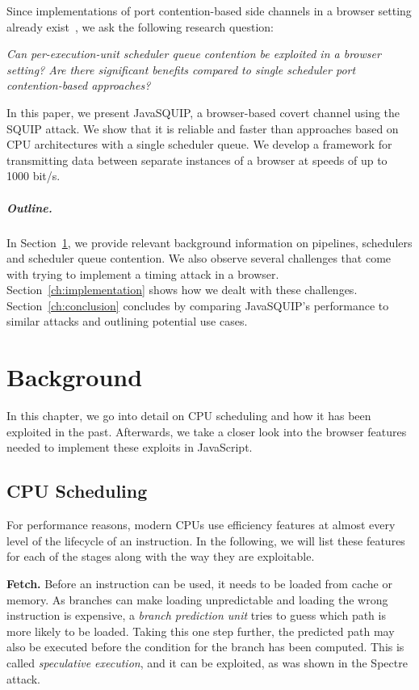 \documentclass[11pt,
  titlepage=false,
]{scrreprt}
\begin{document}
Since implementations of port contention-based side channels in a browser setting already exist~\cite{Rokicki2022webport}, we ask the following research question:

\textit{Can per-execution-unit scheduler queue contention be exploited in a browser setting? Are there significant benefits compared to single scheduler port contention-based approaches?}

In this paper, we present JavaSQUIP, a browser-based covert channel using the SQUIP attack.
We show that it is reliable and faster than approaches based on CPU architectures with a single scheduler queue.
We develop a framework for transmitting data between separate instances of a browser at speeds of up to 1000 bit/s.

\paragraph{Outline.}
In Section~\ref{ch:background}, we provide relevant background information on pipelines, schedulers and scheduler queue contention.
We also observe several challenges that come with trying to implement a timing attack in a browser.
Section~\ref{ch:implementation} shows how we dealt with these challenges.
Section~\ref{ch:conclusion} concludes by comparing JavaSQUIP's performance to similar attacks and outlining potential use cases.



\chapter{Background}
\label{ch:background}

In this chapter, we go into detail on CPU scheduling and how it has been exploited in the past.
Afterwards, we take a closer look into the browser features needed to implement these exploits in JavaScript.

\section{CPU Scheduling}
\label{sec:cpuschedulers}
For performance reasons, modern CPUs use efficiency features at almost every level of the lifecycle of an instruction.
In the following, we will list these features for each of the stages along with the way they are exploitable.

\textbf{Fetch.}
Before an instruction can be used, it needs to be loaded from cache or memory.
As branches can make loading unpredictable and loading the wrong instruction is expensive, a \textit{branch prediction unit} tries to guess which path is more likely to be loaded.
Taking this one step further, the predicted path may also be executed before the condition for the branch has been computed.
This is called \textit{speculative execution}, and it can be exploited, as was shown in the Spectre~\cite{spKocherHFGGHHLM019} attack.
\end{document}
